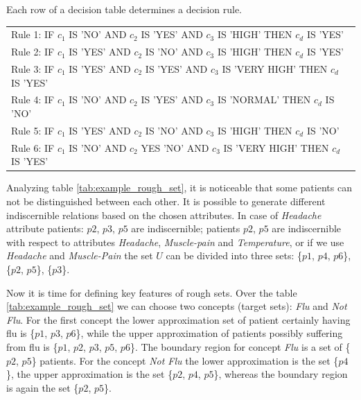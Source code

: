 Each row of a decision table determines a decision rule. 

\begin{tabular}[H]{l}
    Rule 1:  IF $c_1$ IS 'NO' AND $c_2$ IS 'YES' AND $c_3$ IS 'HIGH' THEN $c_d$
    IS 'YES' \\
    Rule 2:  IF $c_1$ IS 'YES' AND $c_2$ IS 'NO' AND $c_3$ IS 'HIGH' THEN $c_d$
    IS 'YES' \\
    Rule 3:  IF $c_1$ IS 'YES' AND $c_2$ IS 'YES' AND $c_3$ IS 'VERY HIGH' THEN
    $c_d$ IS 'YES' \\
    Rule 4:  IF $c_1$ IS 'NO' AND $c_2$ IS 'YES' AND $c_3$ IS 'NORMAL' THEN
    $c_d$ IS 'NO' \\
    Rule 5:  IF $c_1$ IS 'YES' AND $c_2$ IS 'NO' AND $c_3$ IS 'HIGH' THEN $c_d$
    IS 'NO' \\
    Rule 6:  IF $c_1$ IS 'NO' AND $c_2$ YES 'NO' AND $c_3$ IS 'VERY HIGH' THEN
    $c_d$ IS 'YES'  
\end{tabular}


Analyzing table \ref{tab:example_rough_set}, it is noticeable that some
patients can not be distinguished between each other.
It is possible to generate different indiscernible relations based on 
the chosen attributes. In case of \textit{Headache} attribute patients: $p2$,
$p3$, $p5$ are indiscernible; patients $p2$, $p5$ are
indiscernible with respect to attributes \textit{Headache},
\textit{Muscle-pain} and \textit{Temperature}, or if we use \textit{Headache}
and \textit{Muscle-Pain} the set $U$ can be divided into three sets:
\{$p1$, $p4$, $p6$\}, \{$p2$, $p5$\}, \{$p3$\}.

Now it is time for defining key features of rough sets. Over the table
\ref{tab:example_rough_set} we can choose two concepts (target sets):
\textit{Flu} and \textit{Not Flu}. For the first concept the lower approximation
set of patient certainly having flu is \{$p1$, $p3$, $p6$\}, while the upper
approximation of patients possibly suffering from flu is \{$p1$, $p2$, $p3$,
$p5$, $p6$\}. The boundary region for concept \textit{Flu} is a set of \{$p2$, $p5$\} 
patients. For the concept \textit{Not Flu} the lower approximation is the set
\{$p4$\}, the upper approximation is the set \{$p2$, $p4$, $p5$\}, whereas the 
boundary region is again the set \{$p2$, $p5$\}.

